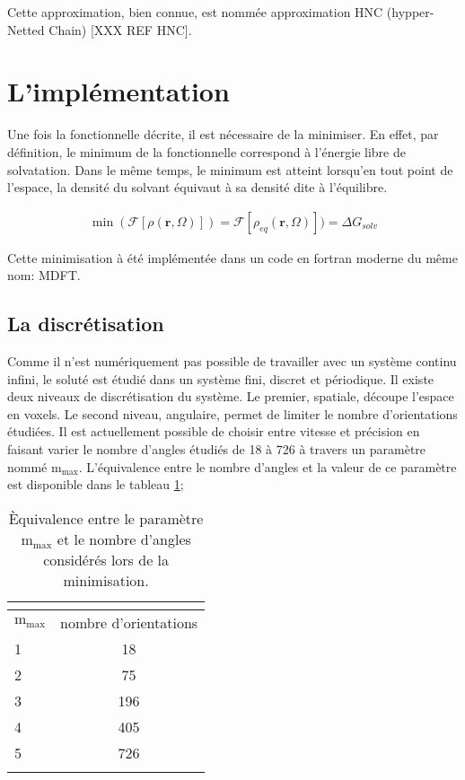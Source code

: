 Cette approximation, bien connue, est nommée approximation HNC (hypper-Netted Chain) [XXX REF HNC]. 


\section{L'implémentation}
Une fois la fonctionnelle décrite, il est nécessaire de la minimiser. En effet, par définition, le minimum de la fonctionnelle correspond à l'énergie libre de solvatation. Dans le même temps, le minimum est atteint lorsqu'en tout point de l'espace, la densité du solvant équivaut à sa densité dite à l'équilibre.

\begin{eqnarray}
\min(\mathcal{F}[\rho\left(\boldsymbol{r},\Omega \right)]) = \mathcal{F}[\rho_{eq}\left(\boldsymbol{r},\Omega \right)])= \Delta G_{solv}
\end{eqnarray}

Cette minimisation à été implémentée dans un code en fortran moderne du même nom: MDFT.


\subsection{La discrétisation}
Comme il n'est numériquement pas possible de travailler avec un système continu infini, le soluté est étudié dans un système fini, discret et périodique. Il existe deux niveaux de discrétisation du système. Le premier, spatiale, découpe l'espace en voxels. Le second niveau, angulaire\cite{ding_cea-01564512}, permet de limiter le nombre d'orientations étudiées. Il est actuellement possible de choisir entre vitesse et précision en faisant varier le nombre d'angles étudiés de 18 à 726 à travers un paramètre nommé $\mathrm{m}_\mathrm{max}$. L'équivalence entre le nombre d'angles et la valeur de ce paramètre est disponible dans le tableau \ref{tab:mmax};

\begin{table}[H]
 \centering
  \begin{tabular}{l | c }
    \hline \multicolumn{2}{c}{} \\[-1em]\hline
    $\mathrm{m}_\mathrm{max}$ & nombre d'orientations \\
    \hline
    1  & 18 \\
    2  & 75 \\
    3  & 196 \\
    4  & 405 \\
    5  & 726 \\
    \hline \multicolumn{2}{c}{} \\[-1em]\hline
  \end{tabular}
  \caption{\`Equivalence entre le paramètre $\mathrm{m}_\mathrm{max}$ et le nombre d'angles considérés lors de la minimisation.}
  \label{tab:mmax}  
\end{table}


